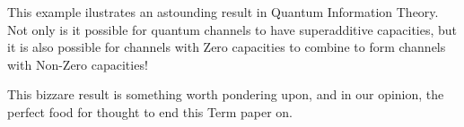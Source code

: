 This example ilustrates an astounding result in Quantum Information Theory. Not only is
it possible for quantum channels to have superadditive capacities, but it is also possible
for channels with Zero capacities to combine to form channels with Non-Zero capacities!

This bizzare result is something worth pondering upon, and in our opinion, the perfect food
for thought to end this Term paper on.
